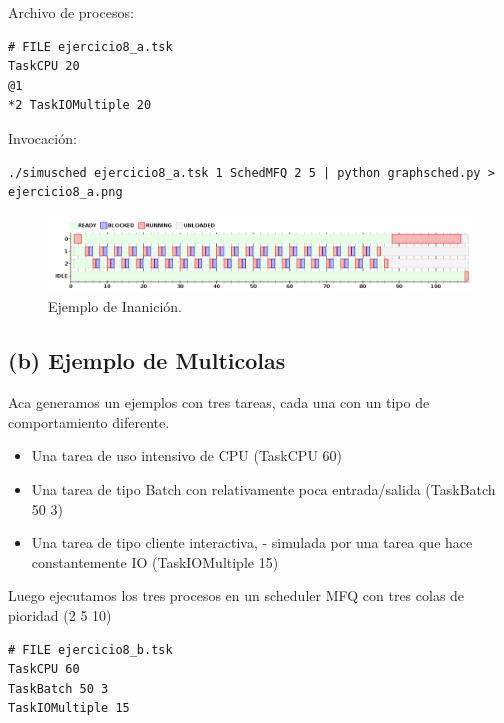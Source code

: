Archivo de procesos:

\begin{framed}
\begin{verbatim}
# FILE ejercicio8_a.tsk
TaskCPU 20
@1
*2 TaskIOMultiple 20
\end{verbatim}
\end{framed}

Invocaci\'on:

\begin{framed}
\begin{verbatim}
./simusched ejercicio8_a.tsk 1 SchedMFQ 2 5 | python graphsched.py > ejercicio8_a.png
\end{verbatim}
\end{framed}

\begin{figure}[h!]
  \caption{Ejemplo de Inanici\'on.}
  \centering
    \includegraphics[width=1\textwidth]{img/ejercicio8_a.png}
\end{figure}

\subsection{(b) Ejemplo de Multicolas}

Aca generamos un ejemplos con tres tareas, cada una con un tipo de comportamiento diferente.

\begin{itemize}
 \item Una tarea de uso intensivo de CPU (TaskCPU 60)
 \item Una tarea de tipo Batch con relativamente poca entrada/salida (TaskBatch 50 3)
 \item Una tarea de tipo cliente interactiva, - simulada por una tarea que hace constantemente IO (TaskIOMultiple 15)
\end{itemize}

Luego ejecutamos los tres procesos en un scheduler MFQ con tres colas de pioridad (2 5 10)

\begin{framed}
\begin{verbatim}
# FILE ejercicio8_b.tsk
TaskCPU 60
TaskBatch 50 3
TaskIOMultiple 15
\end{verbatim}
\end{framed}


